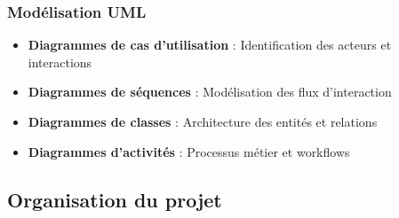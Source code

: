 \documentclass[12pt,a4paper]{report}
\begin{document}
\subsubsection{Modélisation UML}
\begin{itemize}
\item \textbf{Diagrammes de cas d'utilisation} : Identification des acteurs et interactions
\item \textbf{Diagrammes de séquences} : Modélisation des flux d'interaction
\item \textbf{Diagrammes de classes} : Architecture des entités et relations
\item \textbf{Diagrammes d'activités} : Processus métier et workflows
\end{itemize}

\subsection{Organisation du projet}
\end{document}
